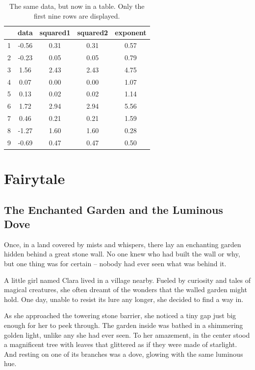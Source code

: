 \documentclass[10pt, fullpage, a4paper, titlepage]{article}
\begin{document}
\begin{table}[ht]
\centering
\caption{The same data, but now in a table. Only the first nine rows are displayed.}

\begin{tabular}{c c c c c}
\hline
 & data & squared1 & squared2 & exponent \\
\hline
1 & -0.56 & 0.31 & 0.31 & 0.57 \\
2 & -0.23 & 0.05 & 0.05 & 0.79 \\
3 & 1.56 & 2.43 & 2.43 & 4.75 \\
4 & 0.07 & 0.00 & 0.00 & 1.07 \\
5 & 0.13 & 0.02 & 0.02 & 1.14 \\
6 & 1.72 & 2.94 & 2.94 & 5.56 \\
7 & 0.46 & 0.21 & 0.21 & 1.59 \\
8 & -1.27 & 1.60 & 1.60 & 0.28 \\
9 & -0.69 & 0.47 & 0.47 & 0.50 \\
\hline
\end{tabular}

\end{table}


\newpage

\section{Fairytale}

\subsection{The Enchanted Garden and the Luminous Dove}

Once, in a land covered by mists and whispers, there lay an enchanting garden hidden behind a great stone wall. No one knew who had built the wall or why, but one thing was for certain – nobody had ever seen what was behind it.

A little girl named Clara lived in a village nearby. Fueled by curiosity and tales of magical creatures, she often dreamt of the wonders that the walled garden might hold. One day, unable to resist its lure any longer, she decided to find a way in.

As she approached the towering stone barrier, she noticed a tiny gap just big enough for her to peek through. The garden inside was bathed in a shimmering golden light, unlike any she had ever seen. To her amazement, in the center stood a magnificent tree with leaves that glittered as if they were made of starlight. And resting on one of its branches was a dove, glowing with the same luminous hue.
\end{document}
